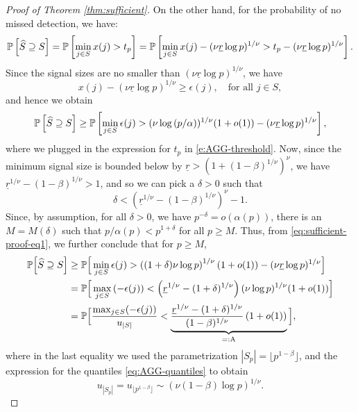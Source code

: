 \begin{proof}[Proof of Theorem \ref{thm:sufficient}]
On the other hand, for the probability of no missed detection, we have:
\begin{equation*}
    \P\left[\widehat{S} \supseteq S\right] 
        = \P\left[\min_{j\in S}x(j) > t_p\right]
        = \P\left[\min_{j\in S}x(j) - (\nu\underline{r}\log p)^{1/\nu} > t_p - (\nu\underline{r}\log p)^{1/\nu} \right].
\end{equation*}
Since the signal sizes are no smaller than $(\nu\underline{r}\log p)^{1/\nu}$, we have
\begin{equation*}
    x(j) - \left(\nu\underline{r}\log{p}\right)^{1/\nu} \ge \epsilon(j), \quad \text{for all }j\in S,
\end{equation*}
and hence we obtain
\begin{equation} \label{eq:sufficient-proof-eq1}
    \P\left[\widehat{S} \supseteq S\right] \ge 
    \P\left[\min_{j\in S}\epsilon(j) > (\nu\log{(p/\alpha)})^{1/\nu}(1+o(1)) - (\nu\underline{r}\log p)^{1/\nu} \right],
\end{equation}
where we plugged in the expression for $t_p$ in \eqref{e:AGG-threshold}.
Now, since the minimum signal size is bounded below by $\underline{r} > \left(1 + (1-\beta)^{1/\nu}\right)^\nu$, we have $\underline{r}^{1/\nu}-(1-\beta)^{1/\nu}>1$, and so we can pick a $\delta > 0$ such that 
\begin{equation} \label{eq:choice-of-delta}
    \delta < \left(\underline{r}^{1/\nu} - (1-\beta)^{1/\nu}\right)^\nu - 1.
\end{equation}
Since, by assumption, for all $\delta>0$, we have $p^{-\delta} = o\left(\alpha(p)\right)$, there is an
$M=M(\delta)$ such that $p/\alpha(p) < p^{1+\delta}$ for all $p\ge M$. Thus, from \eqref{eq:sufficient-proof-eq1}, we further conclude that for $p\ge M$,
\begin{align}
    \P\Big[\widehat{S} \supseteq S\Big]
      &\ge \P\Big[\min_{j\in S}\epsilon(j) > \left((1+\delta)\nu\log{p}\right)^{1/\nu}(1+o(1)) - (\nu\underline{r}\log p)^{1/\nu} \Big] \nonumber\\
      &= \P\Big[\max_{j\in S}\left(-\epsilon(j)\right) < \left(\underline{r}^{1/\nu} - (1+\delta)^{1/\nu}\right)(\nu\log{p})^{1/\nu}(1+o(1)) \Big] \nonumber\\
      &= \P\Big[\frac{\max_{j\in S}(-\epsilon(j))}{u_{|S|}} < \underbrace{\frac{\underline{r}^{1/\nu} - (1+\delta)^{1/\nu}}{(1-\beta)^{1/\nu}}\left(1+o(1)\right)}_{=:\text{A}}\Big], \label{eq:sufficient-proof-eq2}
\end{align}
where in the last equality we used the parametrization $|S_p| = \lfloor p^{1-\beta}\rfloor$, and the expression for the quantiles \eqref{eq:AGG-quantiles} to obtain
\begin{equation}
    u_{|S_p|} = u_{\lfloor p^{1-\beta}\rfloor} \sim \left(\nu(1-\beta)\log{p}\right)^{1/\nu}.
\end{equation}


\end{proof}
